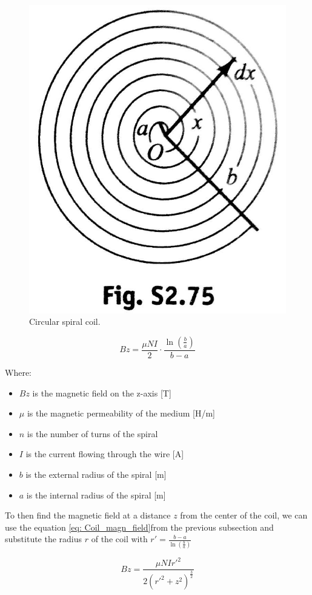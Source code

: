 \begin{figure}
    \centering
    \includegraphics[scale=0.4]{Chapters/Chapter2/PCB_coils/Figures/spiral_windings.jpg} %
    \caption[Coil spiral]{Circular spiral coil.}
    \label{fig: Coil spiral}
\end{figure}

\begin{equation}
    Bz = \frac{\mu N I}{2} \cdot \frac{\ln(\frac{b}{a})}{b-a} %
    \label{eq: Spiral_magn_field}
\end{equation}

Where:
\begin{itemize}
    \item $Bz$ is the magnetic field on the z-axis [T]
    \item $\mu$ is the magnetic permeability of the medium [H/m]
    \item $n$ is the number of turns of the spiral
    \item $I$ is the current flowing through the wire [A]
    \item $b$ is the external radius of the spiral [m]
    \item $a$ is the internal radius of the spiral [m]
\end{itemize}

To then find the magnetic field at a distance $z$ from the center of the coil, we can use the equation \eqref{eq: Coil_magn_field}from the previous subsection and substitute the radius $r$ of the coil with $r' = \frac{b-a}{\ln(\frac{b}{a})}$  

\begin{equation}
    Bz = \frac{\mu N I r'^2}{2(r'^2+z^2)^\frac{3}{2}}
\end{equation}

